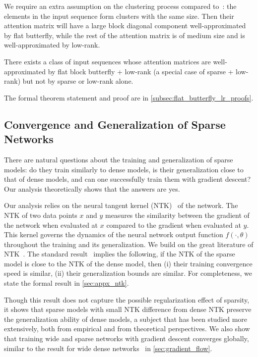 We require an extra assumption on the clustering process compared
to~\citet{scatterbrain}: the elements in the input sequence form clusters with the same size. Then their attention matrix will have a large block diagonal component well-approximated by flat butterfly, while the rest of the attention matrix is of medium size and is well-approximated by low-rank.

\begin{theorem}[Informal]
  There exists a class of input sequences whose attention matrices are well-approximated by flat block butterfly + low-rank (a special case of sparse + low-rank) but not by sparse or low-rank alone.
\end{theorem}

The formal theorem statement and proof are in \ref{subsec:flat_butterfly_lr_proofs}.

\subsection{Convergence and Generalization of Sparse Networks}

There are natural questions about the training and generalization of sparse models: do they train similarly to dense models, is their generalization close to that of dense models, and can one successfully train them with gradient descent? Our analysis theoretically shows that the answers are yes.

Our analysis relies on the neural tangent kernel (NTK)~\citep{jacot2018neural} of the network. The NTK of two data points $x$ and $y$ measures the similarity between the gradient of the network when evaluated at $x$ compared to the gradient when evaluated at $y$. This kernel governs the dynamics of the neural network output function $f(\cdot, \theta)$ throughout the training and its generalization. We build on the great literature of NTK~\citep{ll18,dzps19,als19_dnn}. The standard result~\citep{sy19} implies the following, if the NTK of the sparse model is close to the NTK of the dense model, then (i) their training convergence speed is similar, (ii) their generalization bounds are similar. For completeness, we state the formal result in \ref{sec:appx_ntk}.

Though this result does not capture the possible regularization effect of sparsity, it shows that sparse models with small NTK difference from dense NTK preserve the generalization ability of dense models, a subject that has been studied more extensively, both from empirical and from theoretical perspectives. We also show that training wide and sparse networks with gradient descent converges globally, similar to the result for wide dense networks~\citep{dzps19,
  als19_dnn} in \ref{sec:gradient_flow}.

